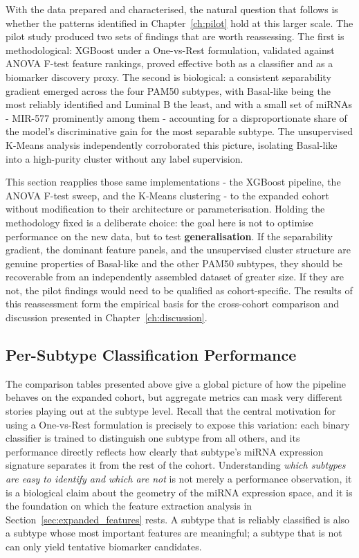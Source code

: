 With the data prepared and characterised, the natural question that follows is
whether the patterns identified in Chapter~\ref{ch:pilot} hold at this larger scale.
The pilot study produced two sets of findings that are worth reassessing. The first
is methodological: XGBoost under a One-vs-Rest formulation, validated against
ANOVA F-test feature rankings, proved effective both as a classifier and as a
biomarker discovery proxy. The second is biological: a consistent separability
gradient emerged across the four PAM50 subtypes, with Basal-like being the most
reliably identified and Luminal B the least, and with a small set of miRNAs -
MIR-577 prominently among them - accounting for a disproportionate share of the
model's discriminative gain for the most separable subtype. The unsupervised
K-Means analysis independently corroborated this picture, isolating Basal-like into
a high-purity cluster without any label supervision.

This section reapplies those same implementations - the XGBoost pipeline, the ANOVA
F-test sweep, and the K-Means clustering - to the expanded cohort without modification
to their architecture or parameterisation. Holding the methodology fixed is a
deliberate choice: the goal here is not to optimise performance on the new data, but
to test \textbf{generalisation}. If the separability gradient, the dominant feature
panels, and the unsupervised cluster structure are genuine properties of Basal-like
and the other PAM50 subtypes, they should be recoverable from an independently
assembled dataset of greater size. If they are not, the pilot findings would need to
be qualified as cohort-specific. The results of this reassessment form the empirical
basis for the cross-cohort comparison and discussion presented in
Chapter~\ref{ch:discussion}.

\subsection{Per-Subtype Classification Performance}
\label{sec:expanded_per_subtype}

The comparison tables presented above give a global picture of how the pipeline
behaves on the expanded cohort, but aggregate metrics can mask very different stories
playing out at the subtype level. Recall that the central motivation for using a
One-vs-Rest formulation is precisely to expose this variation: each binary classifier
is trained to distinguish one subtype from all others, and its performance directly
reflects how clearly that subtype's miRNA expression signature separates it from the
rest of the cohort. Understanding \textit{which subtypes are easy to identify and
which are not} is not merely a performance observation, it is a biological claim
about the geometry of the miRNA expression space, and it is the foundation on which
the feature extraction analysis in Section~\ref{sec:expanded_features} rests. A
subtype that is reliably classified is also a subtype whose most important features
are meaningful; a subtype that is not can only yield tentative biomarker candidates.

